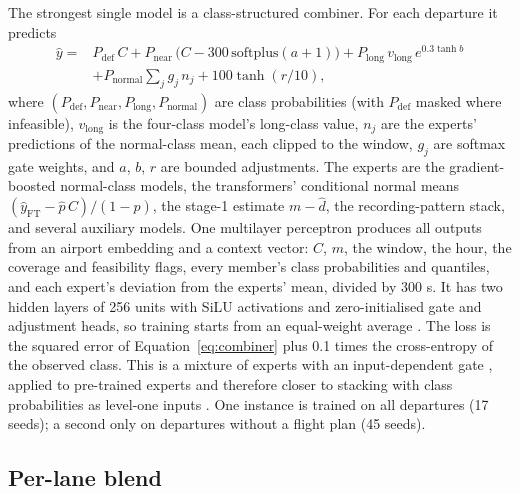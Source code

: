 \documentclass[
  manuscript=article,  %
  layout=preprint,  %
  year=20xx,
  volume=x,
]{extra/joas}
\begin{document}
The strongest single model is a class-structured combiner. For each departure it predicts
\begin{equation}
\begin{split}
\hat{y} = {}& P_{\mathrm{def}}\, C + P_{\mathrm{near}}\,\bigl(C - 300\,\mathrm{softplus}(a+1)\bigr) + P_{\mathrm{long}}\, v_{\mathrm{long}}\, e^{0.3\tanh b} \\
& + P_{\mathrm{normal}} \sum_j g_j\, n_j + 100\tanh(r/10),
\end{split}
\label{eq:combiner}
\end{equation}
where $(P_{\mathrm{def}}, P_{\mathrm{near}}, P_{\mathrm{long}}, P_{\mathrm{normal}})$ are class probabilities (with $P_{\mathrm{def}}$ masked where infeasible), $v_{\mathrm{long}}$ is the four-class model's long-class value, $n_j$ are the experts' predictions of the normal-class mean, each clipped to the window, $g_j$ are softmax gate weights, and $a$, $b$, $r$ are bounded adjustments. The experts are the gradient-boosted normal-class models, the transformers' conditional normal means $(\hat{y}_{\mathrm{FT}} - \hat{p}\,C)/(1-\hat{p})$, the stage-1 estimate $m - \hat{d}$, the recording-pattern stack, and several auxiliary models. One multilayer perceptron produces all outputs from an airport embedding and a context vector: $C$, $m$, the window, the hour, the coverage and feasibility flags, every member's class probabilities and quantiles, and each expert's deviation from the experts' mean, divided by 300 s. It has two hidden layers of 256 units with SiLU activations \cite{elfwing2018sigmoid} and zero-initialised gate and adjustment heads, so training starts from an equal-weight average \cite{bachlechner2021rezero}. The loss is the squared error of Equation~\eqref{eq:combiner} plus 0.1 times the cross-entropy of the observed class. This is a mixture of experts with an input-dependent gate \cite{jacobs1991adaptive,jordan1994hierarchical}, applied to pre-trained experts and therefore closer to stacking with class probabilities as level-one inputs \cite{ting1999issues}. One instance is trained on all departures (17 seeds); a second only on departures without a flight plan (45 seeds).

\subsection{Per-lane blend}
\label{sec:blend}
\end{document}
